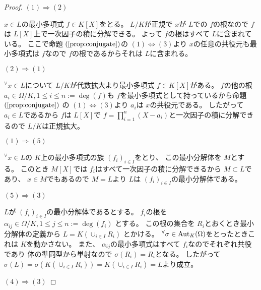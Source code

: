 \documentclass[../master_galois_theory]{subfiles}
\begin{document}
\begin{proof}
  $(1) \Rightarrow (2)$

  $x \in L$の最小多項式 $f \in K[X]$をとる。
  $L/K$が正規で $x$が $L$での $f$の根なので
  $f$は $L[X]$上で一次因子の積に分解できる。
  よって $f$の根はすべて $L$に含まれている。
  ここで命題 $(\mathrm{\ref{prop:conjugate}})$の $(1) \Leftrightarrow (3)$より
  $x$の任意の共役元も最小多項式は $f$なので $f$の根であるからそれは $L$に含まれる。

  $(2) \Rightarrow (1)$

  ${}^\forall x \in L$について $L/K$が代数拡大より最小多項式 $f \in K[X]$がある。
  $f$の他の根 $a_i \in \Omega/K , 1 \leq i \leq n := \deg(f)$も
  $f$を最小多項式として持っているから命題 $(\mathrm{\ref{prop:conjugate}})$
  の $(1) \Leftrightarrow (3)$より $a_i$は $x$の共役元である。
  したがって $a_i \in L$であるから $f$は $L[X]$で $f = \prod_{i=1}^n (X - a_i)$と一次因子の積に分解できるので $L/K$は正規拡大。

  $(1) \Rightarrow (5)$

  ${}^\forall x \in L$の $K$上の最小多項式の族 $(f_i)_{i \in I}$をとり、
  この最小分解体を $M$とする。
  このとき $M[X]$では $f_i$はすべて一次因子の積に分解できるから
  $M \subset L$であり、 $x \in M$でもあるので $M = L$より
  $L$は $(f_i)_{i \in I}$の最小分解体である。

  $(5) \Rightarrow (3)$

  $L$が $(f_i)_{i \in I}$の最小分解体であるとする。
  $f_i$の根を $\alpha_{ij} \in \Omega/K , 1 \leq j \leq n := \deg(f_i)$
  とする。
  この根の集合を $R_i$とおくとき最小分解体の定義から $L = K(\cup_{i \in I} R_i)$
  とかける。
  ${}^\forall \sigma \in \mathrm{Aut}_K(\Omega)$をとったときこれは $K$を動かさない。
  また、 $\alpha_{ij}$の最小多項式はすべて $f_i$なのでそれぞれ共役であり
  体の準同型から単射なので $\sigma(R_i) = R_i$となる。
  したがって $\sigma(L) = \sigma(K(\cup_{i \in I}R_i)) = K(\cup_{i \in I}R_i) = L$より成立。

  $(4) \Rightarrow (3)$


\end{proof}
\end{document}
